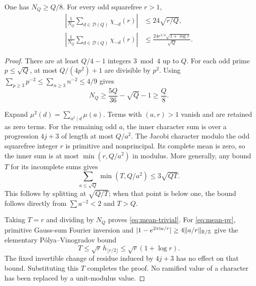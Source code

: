 \begin{lemma}\label{lem:quadratic-mean}
One has $N_Q\ge Q/8$. For every odd squarefree $r>1$,
\begin{align}
 \left|\frac1{N_Q}\sum_{d\in\mathcal D(Q)}\chi_{-d}(r)\right|
 &\le24\sqrt{r/Q},\label{eq:mean-trivial}\\
 \left|\frac1{N_Q}\sum_{d\in\mathcal D(Q)}\chi_{-d}(r)\right|
 &\le\frac{24r^{1/4}\sqrt{1+\log r}}{\sqrt Q}.
 \label{eq:mean-pv}
\end{align}
\end{lemma}
\begin{proof}
There are at least $Q/4-1$ integers $3\bmod4$ up to $Q$. For each odd prime $p\le\sqrt Q$, at most $Q/(4p^2)+1$ are divisible by $p^2$. Using $\sum_{p\ge3}p^{-2}\le\sum_{n\ge3}n^{-2}\le4/9$ gives
\[
 N_Q\ge\frac{5Q}{36}-\sqrt Q-1\ge\frac Q8.
\]

Expand $\mu^2(d)=\sum_{a^2\mid d}\mu(a)$. Terms with $(a,r)>1$ vanish and are retained as zero terms. For the remaining odd $a$, the inner character sum is over a progression $4j+3$ of length at most $Q/a^2$. The Jacobi character modulo the odd squarefree integer $r$ is primitive and nonprincipal. Its complete mean is zero, so the inner sum is at most $\min(r,Q/a^2)$ in modulus. More generally, any bound $T$ for its incomplete sums gives
\[
 \sum_{a\le\sqrt Q}\min(T,Q/a^2)\le3\sqrt{QT}.
\]
This follows by splitting at $\sqrt{Q/T}$; when that point is below one, the bound follows directly from $\sum a^{-2}<2$ and $T>Q$.

Taking $T=r$ and dividing by $N_Q$ proves \eqref{eq:mean-trivial}. For \eqref{eq:mean-pv}, primitive Gauss-sum Fourier inversion and
$\lvert1-e^{2\pi\mathrm i a/r}\rvert\ge4\lVert a/r\rVert_{\mathbb R/\mathbb Z}$ give the elementary P\'olya--Vinogradov bound
\[
 T\le\sqrt r\,h_{\lfloor r/2\rfloor}
 \le\sqrt r(1+\log r).
\]
The fixed invertible change of residue induced by $4j+3$ has no effect on that bound. Substituting this $T$ completes the proof. No ramified value of a character has been replaced by a unit-modulus value.
\end{proof}

